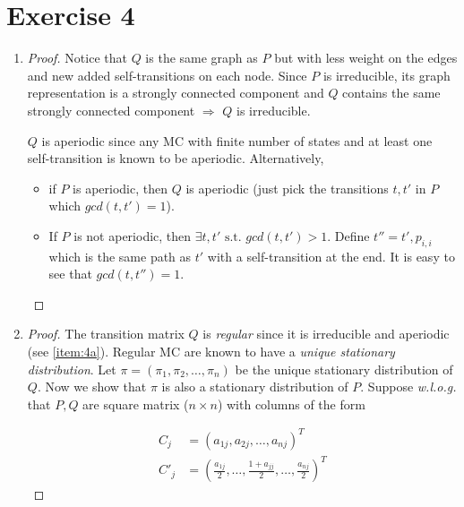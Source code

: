 \documentclass[12pt, a4paper]{article} %
\begin{document}

\section*{Exercise 4}
\label{sec:4}

\begin{enumerate}[label=(\alph*)]
  \item\label{item:4a} \begin{proof} Notice that $Q$ is the same graph as $P$ but with less weight on the edges and new added self-transitions on each node. Since $P$ is irreducible, its graph representation is a strongly connected component and $Q$ contains the same strongly connected component $\Rightarrow$ $Q$ is irreducible.

  $Q$ is aperiodic since any MC with finite number of states and at least one self-transition is known to be aperiodic. Alternatively,

    \begin{itemize}
      \item if $P$ is aperiodic, then $Q$ is aperiodic (just pick the transitions $t, t'$ in $P$ which $gcd(t, t') = 1$).
      \item If $P$ is not aperiodic, then $\exists t, t' \text{ s.t. } gcd(t, t') > 1$. Define ${t'' = t', p_{i,i}}$ which is the same path as $t'$ with a self-transition at the end. It is easy to see that $gcd(t, t'') = 1$.
    \end{itemize}

  \end{proof}

\item\label{item:4b} \begin{proof} The transition matrix $Q$ is \textit{regular} since it is irreducible and aperiodic (see \ref{item:4a}). Regular MC are known to have a \textit{unique stationary distribution}. Let $\pi = (\pi_1, \pi_2, \ldots, \pi_n)$ be the unique stationary distribution of $Q$. Now we show that $\pi$ is also a stationary distribution of $P$. Suppose \textit{w.l.o.g.} that $P, Q$ are square matrix ($n \times n$) with columns of the form

    \begin{align*}
      C_j &= (a_{1j}, a_{2j}, \ldots, a_{nj})^T \\
      C'_j &= (\frac{a_{1j}}{2}, \ldots, \frac{1 + a_{jj}}{2}, \ldots, \frac{a_{nj}}{2})^T
    \end{align*}


\end{proof}
\end{enumerate}
\end{document}
